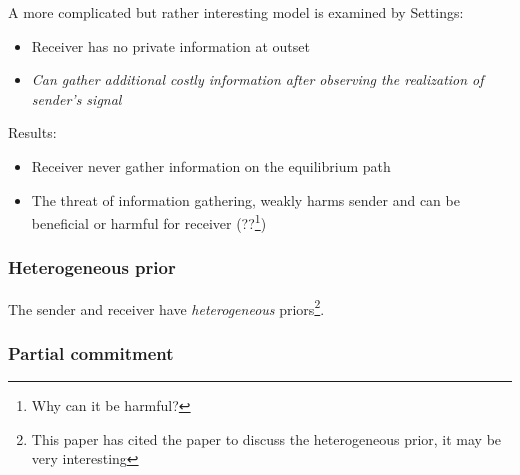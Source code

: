 \documentclass[12pt,letterpaper]{article}
\theoremstyle{definition}   %
\begin{document}
A more complicated but rather interesting model is examined by \cite{matyskova2018bayesian}
Settings:
\begin{itemize}
	\item Receiver has no private information at outset
	\item \emph{Can gather additional costly information after observing the realization of sender's signal}
\end{itemize}
Results:
\begin{itemize}
	\item Receiver never gather information on the equilibrium path
	\item The threat of information gathering, weakly harms sender and can be beneficial or harmful for receiver (??\footnote{Why can it be harmful?})
\end{itemize}

\subsubsection*{Heterogeneous prior}

\cite{alonso2016bayesian}
The sender and receiver have \emph{heterogeneous} priors\footnote{This paper has cited the paper \cite{aumann1966game} to discuss the heterogeneous prior, it may be very interesting}.



\subsubsection*{Partial commitment}

\cite{min2020bayesian, frechette2019rules,lipnowski2019persuasion} 





\end{document}
